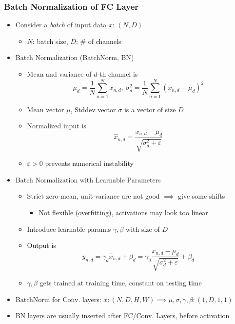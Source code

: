 \subsubsection*{Batch Normalization of FC Layer}
\begin{itemize}
    \item Consider a \textit{batch} of input data $x$: $(N,D)$
    \begin{itemize}
        \item $N$: batch size, $D$: \# of channels
    \end{itemize}
    \item Batch Normalization (BatchNorm, BN)
    \begin{itemize}
        \item Mean and variance of $d$-th channel is
        \begin{equation}
            \mu_d=\frac{1}{N}\sum_{n=1}^Nx_{n,d},~\sigma_d^2=\frac{1}{N}\sum_{n=1}^N\left(x_{n,d}-\mu_d\right)^2
        \end{equation}
        \item Mean vector $\mu$, Stddev vector $\sigma$ is a vector of size $D$
        \item Normalized input is
        \begin{equation}
            \hat{x}_{n,d}=\frac{x_{n,d}-\mu_d}{\sqrt{\sigma_d^2+\varepsilon}}
        \end{equation}
        \item $\varepsilon>0$ prevents numerical instability
    \end{itemize}
    \item Batch Normalization with Learnable Parameters
    \begin{itemize}
        \item Strict zero-mean, unit-variance are not good $\implies$ give some shifts
        \begin{itemize}
            \item Not flexible (overfitting), activations may look too linear
        \end{itemize}
        \item Introduce learnable param.s $\gamma,\beta$ with size of $D$
        \item Output is
        \begin{equation}
            y_{n,d}=\gamma_d\hat{x}_{n,d}+\beta_d=\gamma_d\frac{x_{n,d}-\mu_d}{\sqrt{\sigma_d^2+\varepsilon}}+\beta_d
        \end{equation}
        \item $\gamma,\beta$ gets trained at training time, constant on testing time
    \end{itemize}
    \item BatchNorm for Conv. layers: $x:(N,D,H,W)\implies\mu,\sigma,\gamma,\beta:(1,D,1,1)$
    \item BN layers are usually inserted after FC/Conv. Layers, before activation
\end{itemize}

